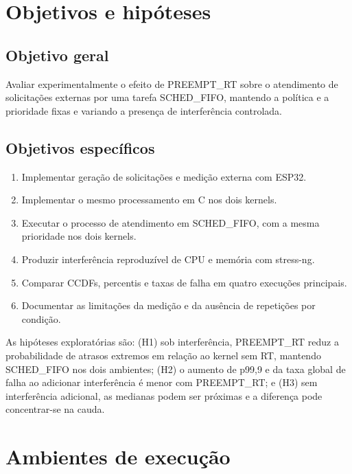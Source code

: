 \documentclass[11pt,a4paper]{article}
\begin{document}
\section{Objetivos e hipóteses}

\subsection{Objetivo geral}

Avaliar experimentalmente o efeito de PREEMPT\_RT sobre o atendimento de solicitações externas por uma tarefa SCHED\_FIFO, mantendo a política e a prioridade fixas e variando a presença de interferência controlada.

\subsection{Objetivos específicos}

\begin{enumerate}
\item Implementar geração de solicitações e medição externa com ESP32.
\item Implementar o mesmo processamento em C nos dois kernels.
\item Executar o processo de atendimento em SCHED\_FIFO, com a mesma prioridade nos dois kernels.
\item Produzir interferência reproduzível de CPU e memória com stress-ng.
\item Comparar CCDFs, percentis e taxas de falha em quatro execuções principais.
\item Documentar as limitações da medição e da ausência de repetições por condição.
\end{enumerate}

As hipóteses exploratórias são: (H1) sob interferência, PREEMPT\_RT reduz a probabilidade de atrasos extremos em relação ao kernel sem RT, mantendo SCHED\_FIFO nos dois ambientes; (H2) o aumento de p99,9 e da taxa global de falha ao adicionar interferência é menor com PREEMPT\_RT; e (H3) sem interferência adicional, as medianas podem ser próximas e a diferença pode concentrar-se na cauda. %

\section{Ambientes de execução}
\end{document}
